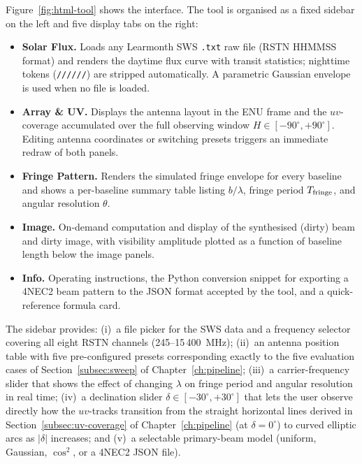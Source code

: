 Figure~\ref{fig:html-tool} shows the interface. The tool is organised as a
fixed sidebar on the left and five display tabs on the right:

\begin{itemize}[leftmargin=*]
  \item \textbf{Solar Flux.} Loads any Learmonth SWS \texttt{.txt} raw file
  (RSTN HHMMSS format) and renders the daytime flux curve with transit
  statistics; nighttime tokens (\texttt{//////}) are stripped automatically.
  A parametric Gaussian envelope is used when no file is loaded.

  \item \textbf{Array \& UV.} Displays the antenna layout in the ENU frame
  and the $uv$-coverage accumulated over the full observing window
  $H\in[-90^\circ,+90^\circ]$. Editing antenna coordinates or switching
  presets triggers an immediate redraw of both panels.

  \item \textbf{Fringe Pattern.} Renders the simulated fringe envelope for every
  baseline and shows a per-baseline summary table listing $b/\lambda$, fringe
  period $T_{\rm fringe}$, and angular resolution $\theta$.

  \item \textbf{Image.} On-demand computation and display of the synthesised
  (dirty) beam and dirty image, with visibility amplitude plotted as a function
  of baseline length below the image panels.

  \item \textbf{Info.} Operating instructions, the Python conversion snippet for
  exporting a 4NEC2 beam pattern to the JSON format accepted by the tool, and a
  quick-reference formula card.
\end{itemize}

The sidebar provides: (i)~a file picker for the SWS data and a frequency
selector covering all eight RSTN channels (245--15\,400~MHz); (ii)~an antenna
position table with five pre-configured presets corresponding exactly to the
five evaluation cases of Section~\ref{subsec:sweep} of Chapter~\ref{ch:pipeline};
(iii)~a carrier-frequency slider that shows the effect of changing $\lambda$ on
fringe period and angular resolution in real time; (iv)~a declination slider
$\delta\in[-30^\circ,+30^\circ]$ that lets the user observe directly how the
$uv$-tracks transition from the straight horizontal lines derived in
Section~\ref{subsec:uv-coverage} of Chapter~\ref{ch:pipeline} (at $\delta=0^\circ$)
to curved elliptic arcs as $|\delta|$ increases; and (v)~a selectable
primary-beam model (uniform, Gaussian, $\cos^2$, or a 4NEC2 JSON file).

